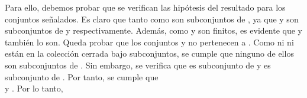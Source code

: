\begin{isabellebody}
\begin{isamarkuptext}
\begin{demostracion}
  Para ello, debemos probar que se verifican las hipótesis del resultado para los conjuntos
  señalados. Es claro que tanto  como  son subconjuntos de , ya que  y
   son subconjuntos de  y  respectivamente. Además, como  y  son
  finitos, es evidente que  y  también lo son. Queda probar que los conjuntos 
   y  no pertenecen a . Como ni 
   ni  están en la colección  cerrada bajo subconjuntos, se cumple que ninguno de ellos 
  son subconjuntos de . Sin embargo, se verifica que  es subconjunto de  y  es 
  subconjunto de . Por tanto, se cumple que\\  y . Por lo tanto,

\end{demostracion}
\end{isamarkuptext}
\end{isabellebody}
